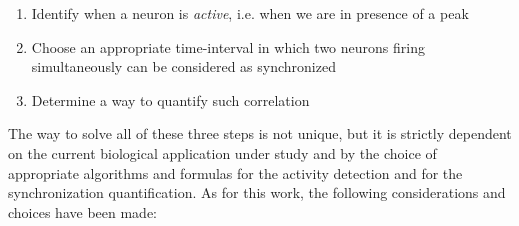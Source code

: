 \documentclass[a4paper]{article}
\begin{document}
\begin{enumerate}
	
	\item Identify when a neuron is \textit{active}, i.e. when we are in presence of a peak
	
	\item Choose an appropriate time-interval in which two neurons firing simultaneously can be considered as synchronized
	
	\item Determine a way to quantify such correlation
	
\end{enumerate}



The way to solve all of these three steps is not unique, but it is strictly dependent on the current biological application under study and by the choice of appropriate algorithms and formulas for the activity detection and for the synchronization quantification. As for this work, the following considerations and choices have been made:
\end{document}
